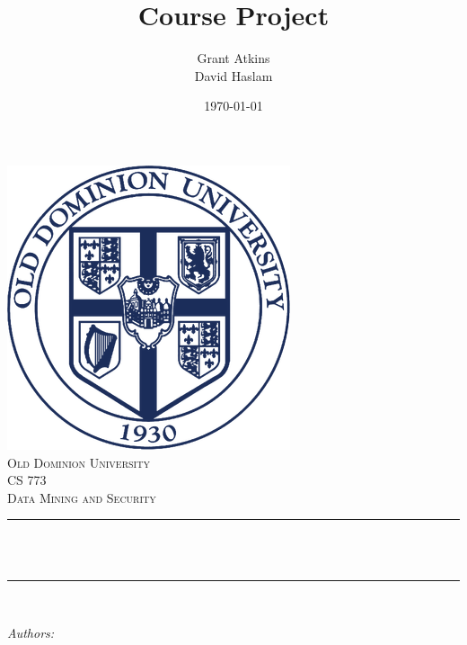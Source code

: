 \documentclass[12pt]{article}
\title{Course Project}										%
\author{Grant Atkins\\David Haslam}							%
\date{\today}											%
\makeatletter
\let\thetitle\@title
\let\theauthor\@author
\let\thedate\@date
\makeatother
\begin{document}

\begin{titlepage}
	\centering
    \vspace*{0.5 cm}
    \includegraphics[scale = 1.8]{ODU.png}\\[1.0 cm]	%
    \textsc{\LARGE Old Dominion University}\\[2.0 cm]	%
	\textsc{\Large CS 773}\\[0.5 cm]				%
	\textsc{\large Data Mining and Security}\\[0.5 cm]				%
	\rule{\linewidth}{0.2 mm} \\[0.4 cm]
	{ \huge \bfseries \thetitle}\\
	\rule{\linewidth}{0.2 mm} \\[1.5 cm]
	
	\begin{minipage}{0.4\textwidth}
		\begin{flushleft} \large
			\emph{Authors:}\\
			\theauthor
			\end{flushleft}
			\end{minipage}~
			\begin{minipage}{0.4\textwidth}
			\begin{flushright} \large
		\end{flushright}
	\end{minipage}\\[2 cm]
	
	{\large \thedate}\\[2 cm]
 
	\vfill
	
\end{titlepage}
\end{document}
